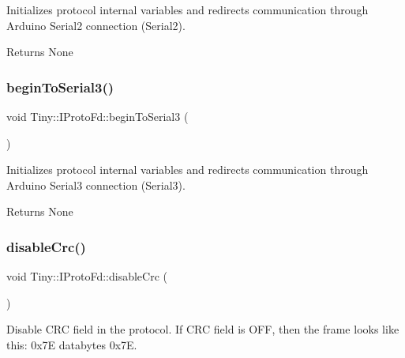 Initializes protocol internal variables and redirects communication through Arduino Serial2 connection (Serial2). \begin{DoxyReturn}{Returns}
None 
\end{DoxyReturn}
\mbox{\label{classTiny_1_1IProtoFd_a2d4df949358d4e8afa391e8960729d71}} 
\subsubsection{\texorpdfstring{begin\+To\+Serial3()}{beginToSerial3()}}
{\footnotesize\ttfamily void Tiny\+::\+I\+Proto\+Fd\+::begin\+To\+Serial3 (\begin{DoxyParamCaption}{ }\end{DoxyParamCaption})\hspace{0.3cm}{\ttfamily [inline]}}

Initializes protocol internal variables and redirects communication through Arduino Serial3 connection (Serial3). \begin{DoxyReturn}{Returns}
None 
\end{DoxyReturn}
\mbox{\label{classTiny_1_1IProtoFd_af41446f47a7c520ff8f9683e6ae45614}} 
\subsubsection{\texorpdfstring{disable\+Crc()}{disableCrc()}}
{\footnotesize\ttfamily void Tiny\+::\+I\+Proto\+Fd\+::disable\+Crc (\begin{DoxyParamCaption}{ }\end{DoxyParamCaption})}

Disable C\+RC field in the protocol. If C\+RC field is O\+FF, then the frame looks like this\+: 0x7E databytes 0x7E. \mbox{\label{classTiny_1_1IProtoFd_a0f43402e86ea64f5c0154477d84b0c7c}} 
